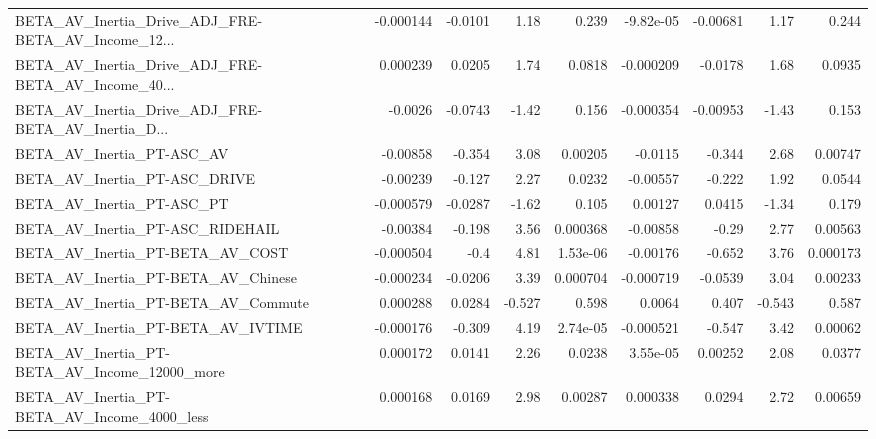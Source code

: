 \begin{tabular}{lrrrrrrrr}
BETA\_AV\_Inertia\_Drive\_ADJ\_FRE-BETA\_AV\_Income\_12... &   -0.000144 &      -0.0101 &     1.18 &    0.239 &  -9.82e-05 &    -0.00681 &         1.17 &         0.244 \\
BETA\_AV\_Inertia\_Drive\_ADJ\_FRE-BETA\_AV\_Income\_40... &    0.000239 &       0.0205 &     1.74 &   0.0818 &  -0.000209 &     -0.0178 &         1.68 &        0.0935 \\
BETA\_AV\_Inertia\_Drive\_ADJ\_FRE-BETA\_AV\_Inertia\_D... &     -0.0026 &      -0.0743 &    -1.42 &    0.156 &  -0.000354 &    -0.00953 &        -1.43 &         0.153 \\
BETA\_AV\_Inertia\_PT-ASC\_AV                          &    -0.00858 &       -0.354 &     3.08 &  0.00205 &    -0.0115 &      -0.344 &         2.68 &       0.00747 \\
BETA\_AV\_Inertia\_PT-ASC\_DRIVE                       &    -0.00239 &       -0.127 &     2.27 &   0.0232 &   -0.00557 &      -0.222 &         1.92 &        0.0544 \\
BETA\_AV\_Inertia\_PT-ASC\_PT                          &   -0.000579 &      -0.0287 &    -1.62 &    0.105 &    0.00127 &      0.0415 &        -1.34 &         0.179 \\
BETA\_AV\_Inertia\_PT-ASC\_RIDEHAIL                    &    -0.00384 &       -0.198 &     3.56 & 0.000368 &   -0.00858 &       -0.29 &         2.77 &       0.00563 \\
BETA\_AV\_Inertia\_PT-BETA\_AV\_COST                    &   -0.000504 &         -0.4 &     4.81 & 1.53e-06 &   -0.00176 &      -0.652 &         3.76 &      0.000173 \\
BETA\_AV\_Inertia\_PT-BETA\_AV\_Chinese                 &   -0.000234 &      -0.0206 &     3.39 & 0.000704 &  -0.000719 &     -0.0539 &         3.04 &       0.00233 \\
BETA\_AV\_Inertia\_PT-BETA\_AV\_Commute                 &    0.000288 &       0.0284 &   -0.527 &    0.598 &     0.0064 &       0.407 &       -0.543 &         0.587 \\
BETA\_AV\_Inertia\_PT-BETA\_AV\_IVTIME                  &   -0.000176 &       -0.309 &     4.19 & 2.74e-05 &  -0.000521 &      -0.547 &         3.42 &       0.00062 \\
BETA\_AV\_Inertia\_PT-BETA\_AV\_Income\_12000\_more       &    0.000172 &       0.0141 &     2.26 &   0.0238 &   3.55e-05 &     0.00252 &         2.08 &        0.0377 \\
BETA\_AV\_Inertia\_PT-BETA\_AV\_Income\_4000\_less        &    0.000168 &       0.0169 &     2.98 &  0.00287 &   0.000338 &      0.0294 &         2.72 &       0.00659 \\

\end{tabular}
